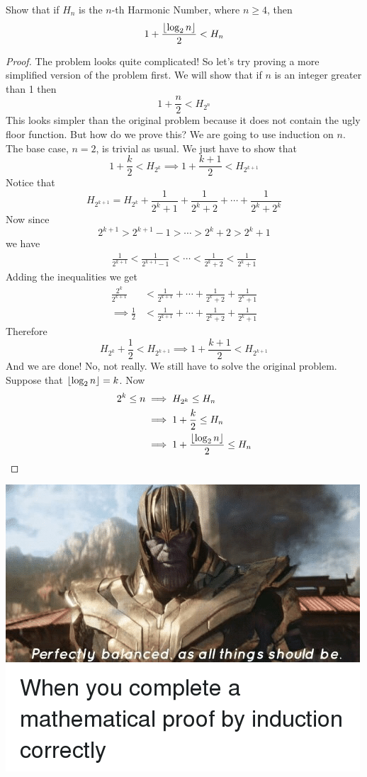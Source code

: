 \documentclass[11pt,numbers=noenddot,svgnames,dvipsnames]{scrartcl}
\begin{document}
\begin{example}
    Show that if $H_{n}$ is the $n$-th Harmonic Number, where $n\geq 4$, then 
    \[
        1 + \frac{\left\lfloor \log_{2} n \right\rfloor}{2} < H_{n}
    \]
\end{example}
\begin{proof}
    The problem looks quite complicated! So let's try proving a more simplified version of the problem first. 
    We will show that if $n$ is an integer greater than 1 then
    \[
        1 + \frac{n}{2} < H_{2^{n}}
    \]
    This looks simpler than the original problem because it does not contain the ugly floor function. 
    But how do we prove this? We are going to use induction on $n$. \\
    The base case, $n = 2$, is trivial as usual. We just have to show that 
    \[
        1 + \frac{k}{2} < H_{2^{k}} \implies 1 + \frac{k + 1}{2} < H_{2^{k + 1}}
    \]
    Notice that 
    \[
        H_{2^{k + 1}} = H_{2^{k}} + \frac{1}{2^{k} + 1} + \frac{1}{2^{k} + 2} + \cdots + \frac{1}{2^{k} + 2^{k}}
    \]
    Now since 
    \[
        2^{k + 1} > 2^{k + 1} - 1 > \cdots > 2^{k} + 2 > 2^{k} + 1
    \]
    we have 
    \begin{align*}
        \frac{1}{2^{k + 1}} < \frac{1}{2^{k + 1} - 1} < \cdots < \frac{1}{2^{k} + 2} < \frac{1}{2^{k} + 1}
    \end{align*}
    Adding the inequalities we get 
    \begin{align*}
        \frac{2^{k}}{2^{k + 1}} &< \frac{1}{2^{k + 1}} + \cdots + \frac{1}{2^{k} + 2} + \frac{1}{2^{k} + 1} \\
        \implies \frac{1}{2} &< \frac{1}{2^{k + 1}} + \cdots + \frac{1}{2^{k} + 2} + \frac{1}{2^{k} + 1}
    \end{align*}
    Therefore 
    \[
        H_{2^{k}} + \frac{1}{2} < H_{2^{k+1}} \implies 1 + \frac{k + 1}{2} < H_{2^{k + 1}}
    \]
    And we are done! No, not really. We still have to solve the original problem. \\
    Suppose that $\left\lfloor \log_{2} n \right\rfloor = k$. Now
    \begin{align*}
        2^{k} \leq n & \implies H_{2^{k}} \leq H_{n} \\
                     & \implies 1 + \frac{k}{2} \leq H_{n} \\
                     & \implies 1 + \frac{\left\lfloor \log_{2} n \right\rfloor}{2} \leq H_{n}
    \end{align*}
\end{proof}
\begin{center}
\includegraphics[scale=.35]{induction-meme-0.png}
\end{center}
\end{document}
